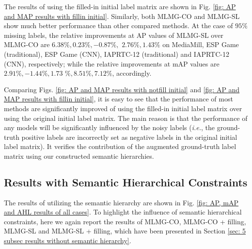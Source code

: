 \documentclass[twocolumn]{svjour3}          %
\begin{document}
The results of using the filled-in initial label matrix are shown in Fig. \ref{fig: AP and MAP results with fillin initial}. 
Similarly, both MLMG-CO and MLMG-SL show much better performance than other compared methods.
At the case of $95\%$ missing labels, the relative improvements at AP values of MLMG-SL over MLMG-CO are $6.38\%, 0.23\%, -0.87\%,$ $2.76\%, 1.43\%$ on MediaMill, ESP Game (traditional), ESP Game (CNN), IAPRTC-12 (traditional) and IAPRTC-12 (CNN), respectively; while the relative improvements at mAP values are $2.91\%,-1.44\%, 1.73$ 
 $\%, 8.51\%, 7.12\%$, accordingly. 

Comparing Figs. \ref{fig: AP and MAP results with notfill initial} and \ref{fig: AP and MAP results with fillin initial}, it is easy to see that the performance of most methods are significantly improved of using the filled-in initial label matrix over using the original initial label matrix. The main reason is that the performance of any models will be significantly influenced by the noisy labels ({\it i.e.}, the ground-truth positive labels are incorrectly set as negative labels in the original initial label matrix). It verifies the contribution of the augmented ground-truth label matrix using our constructed semantic hierarchies. 



\subsection{Results with Semantic Hierarchical Constraints} \label{sec: 5 subsec results with semantic hierarchy}
The results of utilizing the semantic hierarchy are shown in Fig. \ref{fig: AP, mAP and AHL results of all cases}. 
To highlight the influence of semantic hierarchical constraints, here we again report the results of MLMG-CO, MLMG-CO + filling, MLMG-SL and MLMG-SL + filling, which have been presented in Section \ref{sec: 5 subsec results without semantic hierarchy}. 
\end{document}
